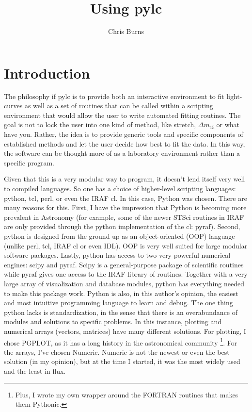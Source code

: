 \documentclass[12pt]{article}
\newcommand{\dmf}{$\Delta m_{15}\ $}
\begin{document}
\title{Using pylc}


\author{Chris Burns}

\maketitle

\section{Introduction}

The philosophy if pylc is to provide both an interactive environment
to fit light-curves as well as a set of routines that can be called
within a scripting environment that would allow the user to write
automated fitting routines. The goal is not to lock the user into
one kind of method, like stretch, \dmf or what have you. Rather,
the idea is to provide generic tools and specific components of established
methods and let the user decide how best to fit the data. In this
way, the software can be thought more of as a laboratory environment
rather than a specific program.

Given that this is a very modular way to program, it doesn't lend
itself very well to compiled languages. So one has a choice of higher-level
scripting languages: python, tcl, perl, or even the IRAF cl. In this
case, Python was chosen. There are many reasons for this. First, I
have the impression that Python is becoming more prevalent in Astronomy
(for example, some of the newer STSci routines in IRAF are only provided
through the python implementation of the cl: pyraf). Second, python
is designed from the ground up as an object-oriented (OOP) language
(unlike perl, tcl, IRAF cl or even IDL). OOP is very well suited for
large modular software packages. Lastly, python has access to two
very powerful numerical engines: scipy and pyraf. Scipy is a general-purpose
package of scientific routines while pyraf gives one access to the
IRAF library of routines. Together with a very large array of visualization
and database modules, python has everything needed to make this package
work. Python is also, in this author's opinion, the easiest and most
intuitive programming language to learn and debug. The one thing python
lacks is standardization, in the sense that there is an overabundance
of modules and solutions to specific problems. In this instance, plotting
and numerical arrays (vectors, matrices) have many different solutions.
For plotting, I chose PGPLOT, as it has a long history in the astronomical
community%
\footnote{Plus, I wrote my own wrapper around the FORTRAN routines that makes
them Pythonic.%
}. For the arrays, I've chosen Numeric. Numeric is not the newest or
even the best solution (in my opinion), but at the time I started,
it was the most widely used and the least in flux.
\end{document}
